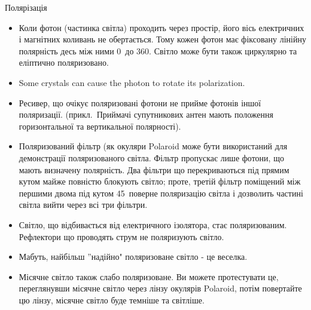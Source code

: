 {\Large Полярізація}
\begin{itemize}

\item Коли фотон (частинка світла) проходить через простір, його вісь електричних і магнітних коливань не обертається. Тому кожен фотон має фіксовану лінійну полярність десь між ними 0\degree\ до 360\degree. Світло може бути також циркулярно та еліптично поляризовано.

\item Some crystals can cause the photon to rotate its polarization.

\item Ресивер, що очікує поляризовані фотони не прийме фотонів іншої поляризації. (прикл.\ Приймачі супутникових антен мають положення горизонтальної та вертикальної полярності).

\item Поляризований фільтр (як окуляри Polaroid\texttrademark\) може бути використаний для демонстрації поляризованого світла. Фільтр пропускає лише фотони, що мають визначену полярність. Два фільтри що перекриваються  під прямим кутом майже повністю блокують світло; проте, третій фільтр поміщений між першими двома під кутом 45\degree\ поверне поляризацію світла і дозволить частині світла вийти через всі три фільтри.

\item Світло, що відбивається від електричного ізолятора, стає поляризованим. Рефлектори що проводять струм не поляризують світло.

\item Мабуть, найбільш ''надійно" поляризоване світло - це веселка.

\item Місячне світло також слабо поляризоване. Ви можете протестувати це, переглянувши місячне світло через лінзу окулярів Polaroid\texttrademark, потім повертайте цю лінзу, місячне світло буде темніше та світліше.

\end{itemize}


